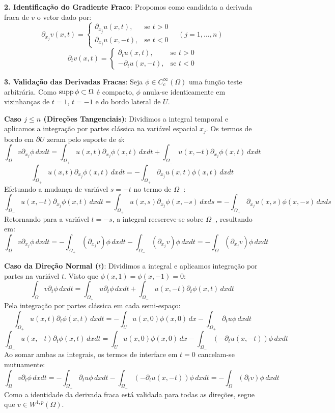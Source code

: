 \documentclass[cs_edp_2026.1.tex]{subfiles} %
\begin{document}
{	\textbf{2. Identificação do Gradiente Fraco}:
	Propomos como candidata a derivada fraca de $v$ o vetor dado por:
	$$\partial_{x_j} v(x,t) = \begin{cases} \partial_{x_j} u(x,t), & \text{se } t > 0 \\ \partial_{x_j} u(x,-t), & \text{se } t < 0 \end{cases} \quad (j = 1, \dots, n)$$
	$$\partial_t v(x,t) = \begin{cases} \partial_t u(x,t), & \text{se } t > 0 \\ -\partial_t u(x,-t), & \text{se } t < 0 \end{cases}$$
	
	\textbf{3. Validação das Derivadas Fracas}:
	Seja $\phi \in C_c^\infty(\Omega)$ uma função teste arbitrária. Como $\operatorname{supp} \phi \subset \Omega$ é compacto, $\phi$ anula-se identicamente em vizinhanças de $t = 1$, $t = -1$ e do bordo lateral de $U$.
	
	\textbf{Caso $j \le n$ (Direções Tangenciais)}:
	Dividimos a integral temporal e aplicamos a integração por partes clássica na variável espacial $x_j$. Os termos de bordo em $\partial U$ zeram pelo suporte de $\phi$:
	$$\int_\Omega v \partial_{x_j} \phi \, dx dt = \int_{\Omega_+} u(x,t) \partial_{x_j} \phi(x,t) \, dx dt + \int_{\Omega_-} u(x,-t) \partial_{x_j} \phi(x,t) \, dx dt$$
	$$\int_{\Omega_+} u(x,t) \partial_{x_j} \phi(x,t) \, dx dt = - \int_{\Omega_+} \partial_{x_j} u(x,t) \phi(x,t) \, dx dt$$
	Efetuando a mudança de variável $s = -t$ no termo de $\Omega_-$:
	$$\int_{\Omega_-} u(x,-t) \partial_{x_j} \phi(x,t) \, dx dt = \int_{\Omega_+} u(x,s) \partial_{x_j} \phi(x,-s) \, dx ds = - \int_{\Omega_+} \partial_{x_j} u(x,s) \phi(x,-s) \, dx ds$$
	Retornando para a variável $t = -s$, a integral reescreve-se sobre $\Omega_-$, resultando em:
	$$\int_\Omega v \partial_{x_j} \phi \, dx dt = - \int_{\Omega_+} (\partial_{x_j} v) \phi \, dx dt - \int_{\Omega_-} (\partial_{x_j} v) \phi \, dx dt = - \int_\Omega (\partial_{x_j} v) \phi \, dx dt$$
	
	\textbf{Caso da Direção Normal ($t$)}:
	Dividimos a integral e aplicamos integração por partes na variável $t$. Visto que $\phi(x,1) = \phi(x,-1) = 0$:
	$$\int_\Omega v \partial_t \phi \, dx dt = \int_{\Omega_+} u \partial_t \phi \, dx dt + \int_{\Omega_-} u(x,-t) \partial_t \phi(x,t) \, dx dt$$
	Pela integração por partes clássica em cada semi-espaço:
	$$\int_{\Omega_+} u(x,t) \partial_t \phi(x,t) \, dx dt = - \int_U u(x,0)\phi(x,0) \, dx - \int_{\Omega_+} \partial_t u \phi \, dx dt$$
	$$\int_{\Omega_-} u(x,-t) \partial_t \phi(x,t) \, dx dt = \int_U u(x,0)\phi(x,0) \, dx - \int_{\Omega_-} (-\partial_t u(x,-t)) \phi \, dx dt$$
	Ao somar ambas as integrais, os termos de interface em $t=0$ cancelam-se mutuamente:
	$$\int_\Omega v \partial_t \phi \, dx dt = - \int_{\Omega_+} \partial_t u \phi \, dx dt - \int_{\Omega_-} (-\partial_t u(x,-t)) \phi \, dx dt = - \int_\Omega (\partial_t v) \phi \, dx dt$$
	Como a identidade da derivada fraca está validada para todas as direções, segue que $v \in W^{1,p}(\Omega)$.
	
}
\end{document}
